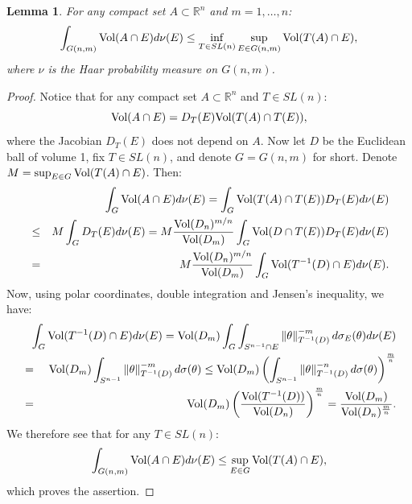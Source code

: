 \documentclass[12pt,oneside]{amsart}
\newtheorem{lem}[thm]{Lemma}
\theoremstyle{definition}
\theoremstyle{remark}
\theoremstyle{proof}
\numberwithin{equation}{section}
\newcommand{\norm}[1]{\left\Vert#1\right\Vert}
\newcommand{\brac}[1]{\left(#1\right)}
\newcommand{\Real}{\mathbb{R}}
\newcommand{\Vol}[1]{\textnormal{Vol} (#1)}
\begin{document}
\begin{lem} \label{lem:average-sections-generic}
For any compact set $A \subset \Real^n$ and $m=1,\ldots,n$:
\[
\int_{G(n,m)} \Vol{A \cap E} d\nu(E) \leq \inf_{T \in SL(n)}
\sup_{E \in G(n,m)} \Vol{T(A) \cap E},
\]
where $\nu$ is the Haar probability measure on $G(n,m)$.
\end{lem}
\begin{proof}
Notice that for any compact set $A \subset \Real^n$ and $T \in
SL(n)$:
\[
\Vol{A \cap E} = D_T(E) \Vol{T(A) \cap T(E)},
\]
where the Jacobian $D_T(E)$ does not depend on $A$. Now let $D$
be the Euclidean ball of volume 1, fix $T \in SL(n)$, and denote
$G = G(n,m)$ for short. Denote $M = \sup_{E \in G} \Vol{T(A) \cap
E}$. Then:
\begin{eqnarray}
\nonumber & & \int_{G} \Vol{A \cap E} d\nu(E) = \int_{G}
\Vol{T(A) \cap T(E)} D_T(E) d\nu(E) \\
\nonumber & \leq & M \int_{G} D_T(E) d\nu(E) = M
\frac{\Vol{D_n}^{m/n}}{\Vol{D_m}} \int_{G} \Vol{D \cap T(E)}
D_T(E) d\nu(E) \\
\nonumber & = & M  \frac{\Vol{D_n}^{m/n}}{\Vol{D_m}} \int_{G}
\Vol{T^{-1}(D) \cap E} d\nu(E).
\end{eqnarray}
Now, using polar coordinates, double integration and Jensen's
inequality, we have:
\begin{eqnarray}
\nonumber &  & \!\!\!\!\!\!\! \int_{G} \Vol{T^{-1}(D) \cap E}
d\nu(E) = \Vol{D_m} \int_G \int_{S^{n-1} \cap E}
\norm{\theta}^{-m}_{T^{-1}(D)}
d\sigma_{E}(\theta) d\nu(E) \\
\nonumber & = & \Vol{D_m} \int_{S^{n-1}}
\norm{\theta}^{-m}_{T^{-1}(D)} d\sigma(\theta) \leq \Vol{D_m}
\brac{\int_{S^{n-1}} \norm{\theta}^{-n}_{T^{-1}(D)}
d\sigma(\theta)}^{\frac{m}{n}} \\
\nonumber & = & \Vol{D_m}
\brac{\frac{\Vol{T^{-1}(D)}}{\Vol{D_n}}}^{\frac{m}{n}} =
\frac{\Vol{D_m}}{\Vol{D_n}^{\frac{m}{n}}}.
\end{eqnarray}
We therefore see that for any $T \in SL(n)$:
\[
\int_{G(n,m)} \Vol{A \cap E} d\nu(E) \leq \sup_{E \in G} \Vol{T(A)
\cap E},
\]
which proves the assertion.
\end{proof}
\end{document}

